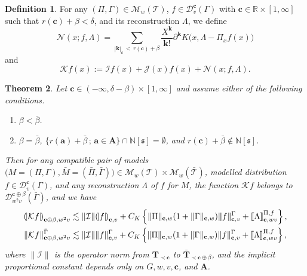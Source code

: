 \documentclass[10pt]{amsart}
\newtheorem{theo}{Theorem}[section]
\theoremstyle{definition}
\newtheorem{defi}[theo]{Definition}
\numberwithin{equation}{section}
\newcommand{\bbR}{\mathbb{R}}
\newcommand{\bbN}{\mathbb{N}}
\newcommand{\mfs}{\mathfrak{s}}
\newcommand{\bfa}{\mathbf{a}}
\newcommand{\bfc}{\mathbf{c}}
\newcommand{\bfcpb}{\mathbf{c}\oplus\beta}
\newcommand{\bfA}{\mathbf{A}}
\newcommand{\bfT}{\mathbf{T}}
\newcommand{\bfk}{\mathbf{k}}
\newcommand{\mcD}{\mathcal{D}}
\newcommand{\mcK}{\mathcal{K}}
\newcommand{\mcI}{\mathcal{I}}
\newcommand{\mcJ}{\mathcal{J}}
\newcommand{\mcN}{\mathcal{N}}
\newcommand{\scT}{\mathscr{T}}
\newcommand{\scM}{\mathscr{M}}
\newcommand{\tri}{|\!|\!|}
\newcommand{\llparenthesis}{\mathopen{(\mkern -2.7mu|}}
\newcommand{\rrparenthesis}{\mathclose{|\mkern -2.7mu)}}
\newcommand{\llbracket}{\mathopen{[\mkern -2.7mu[}}
\newcommand{\rrbracket}{\mathclose{]\mkern -2.7mu]}}
\newcommand{\lp}{\llparenthesis}
\newcommand{\rp}{\rrparenthesis}
\newcommand{\lb}{\llbracket}
\newcommand{\rb}{\rrbracket}
\begin{document}
\begin{defi}
For any $(\Pi,\Gamma)\in\scM_{w}(\scT)$, $f\in\mcD_v^\bfc(\Gamma)$ with $\bfc\in\bbR\times[1,\infty]$ such that $r(\bfc)+\beta<\delta$, and its reconstruction $\Lambda$, we define
\[
\mcN(x;f,\Lambda)=\sum_{|{\bfk}|_{\mfs}\,<\,r(\bfc)+\beta}\frac{X^{\bfk}}{{\bfk}!}\partial^{\bfk}K\big(x,\Lambda-\Pi_xf(x)\big)
\]
and
\[
\mcK f(x):=\mcI f(x)+\mcJ(x)f(x)+\mcN(x;f,\Lambda).
\]
\end{defi}
\begin{theo}\label{thm:besovschauder}
Let $\bfc\in(-\infty,\delta-\beta)\times[1,\infty]$ and assume either of the following conditions.
\begin{enumerate}
\item\label{theo5.12.1} $\beta<\bar\beta$.
\item \label{theo5.12.2}$\beta=\bar\beta$, $\{r(\bfa)+\bar\beta\, ;\, \bfa\in\bfA\}\cap\bbN[\mfs]=\emptyset$, and $r(\bfc)+\bar\beta\notin\bbN[\mfs]$.
\end{enumerate}
Then for any compatible pair of models $\big(M=(\Pi,\Gamma),\bar{M}=(\bar{\Pi},\bar{\Gamma})\big)\in\scM_w(\scT)\times\scM_w(\bar{\scT})$, modelled distribution $f\in\mcD_{v}^\bfc(\Gamma)$, and any reconstruction $\Lambda$ of $f$ for $M$, the function $\mcK f$ belongs to $\mcD_{w^2v}^{\bfcpb}(\bar\Gamma)$, and we have
\begin{align}\label{MSbesov1}
\lp \mcK f\rp_{\bfcpb,w^2v}&\lesssim
\|\mcI\|\lp f\rp_{\bfc,v}+C_K\left\{\|\Pi\|_{\bfc,w}(1+\|\Gamma\|_{\bfc,w})\tri f\tri_{\bfc,v}^\Gamma+\lb\Lambda\rb_{\bfc,wv}^{\Pi,f}\right\},\\\label{MSbesov2}
\|\mcK f\|_{\bfcpb,w^2v}^{\bar\Gamma} &\lesssim\|\mcI\|\| f\|_{\bfc,v}^\Gamma+C_K\left\{\|\Pi\|_{\bfc,w}(1+\|\Gamma\|_{\bfc,w})\| f\|_{\bfc,v}^\Gamma+\lb\Lambda\rb_{\bfc,wv}^{\Pi,f}\right\},
\end{align}
where $\|\mcI\|$ is the operator norm from $\bfT_{\prec\bfc}$ to $\bar{\bfT}_{\prec\bfcpb}$, and the implicit proportional constant depends only on $G,w,v,\bfc$, and $\bfA$.
\end{theo}
\end{document}
